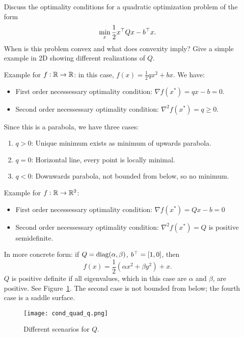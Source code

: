 \documentclass{article}
\begin{document}
\begin{question}
  Discuss the optimality conditions for a quadratic optimization problem of the form
  \begin{equation*}
    \min_x \frac{1}{2} x^{\top} Q x - b^{\top} x.
  \end{equation*}
  When is this problem convex and what does convexity imply? Give a simple example in 2D showing
  different realizations of \(Q\).
\end{question}

Example for \(f: \mathbb{R} \to \mathbb{R}\): in this case, \(f(x) = \frac{1}{2}qx^2 + bx\). We have:
\begin{itemize}
\item First order necessessary optimality condition: \(\nabla f(x^*) = qx - b = 0\).
\item Second order necessessary optimality condition: \(\nabla^2 f(x^*) = q \geq 0\).
\end{itemize}
Since this is a parabola, we have three cases:
\begin{enumerate}
\item \(q > 0\): Unique minimum exists as minimum of upwards parabola.
\item \(q = 0\): Horizontal line, every point is locally minimal.
\item \(q < 0\): Downwards parabola, not bounded from below, so no minimum.
\end{enumerate}

Example for \(f: \mathbb{R} \to \mathbb{R}^2\):
\begin{itemize}
\item First order necessessary optimality condition: \(\nabla f(x^*) = Qx - b = 0\)
\item Second order necessessary optimality condition: \(\nabla^2 f(x^*) = Q\) is positive
  semidefinite.	
\end{itemize}
In more concrete form: if \(Q = \operatorname{diag}(\alpha, \beta)\), \(b^{\top} = [1, 0]\), then
\begin{equation*}
  f(x) = \frac{1}{2} (\alpha x^2 + \beta y^2) + x.
\end{equation*}
\(Q\) is positive definite if all eigenvalues, which in this case are \(\alpha\) and \(\beta\),
are positive.  See Figure~\ref{fig:cond_quad}.  The second case is not bounded from below; the
fourth case is a saddle surface.
\begin{figure}[H]
  \centering
  \texttt{[image: cond\_quad\_q.png]}
  \caption{Different scenarios for \(Q\).\label{fig:cond_quad}}
\end{figure}
\end{document}

